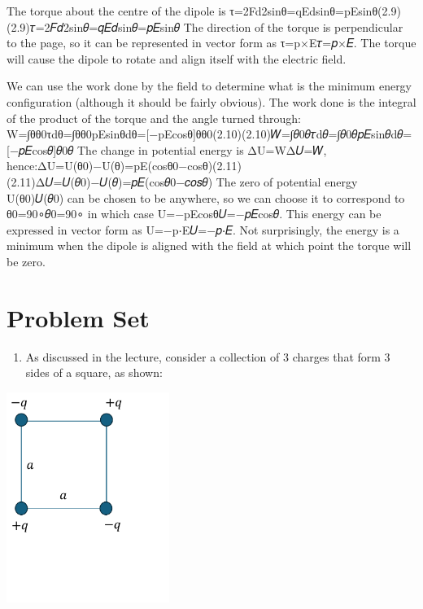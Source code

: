 \documentclass[
  letterpaper,
  DIV=11,
  numbers=noendperiod]{scrreprt}
\providecommand{\tightlist}{%
  \setlength{\itemsep}{0pt}\setlength{\parskip}{0pt}}\usepackage{longtable,booktabs,array}
\begin{document}
The torque about the centre of the dipole is
τ=2Fd2sinθ=qEdsinθ=\textbar p\textbar Esinθ(2.9)(2.9)𝜏=2𝐹𝑑2sin⁡𝜃=𝑞𝐸𝑑sin⁡𝜃=\textbar 𝑝\textbar 𝐸sin⁡𝜃
The direction of the torque is perpendicular to the page, so it can be
represented in vector form as τ=p×E𝜏=𝑝×𝐸. The torque will cause the
dipole to rotate and align itself with the electric field.

We can use the work done by the field to determine what is the minimum
energy configuration (although it should be fairly obvious). The work
done is the integral of the product of the torque and the angle turned
through:
W=∫θθ0\textbar τ\textbar dθ=∫θθ0pEsinθdθ={[}−pEcosθ{]}θθ0(2.10)(2.10)𝑊=∫𝜃0𝜃\textbar 𝜏\textbar d𝜃=∫𝜃0𝜃𝑝𝐸sin⁡𝜃d𝜃={[}−𝑝𝐸cos⁡𝜃{]}𝜃0𝜃
The change in potential energy is ΔU=WΔ𝑈=𝑊,
hence:ΔU=U(θ0)−U(θ)=pE(cosθ0−cosθ)(2.11)(2.11)Δ𝑈=𝑈(𝜃0)−𝑈(𝜃)=𝑝𝐸(cos⁡⁡𝜃0−𝑐𝑜𝑠𝜃)
The zero of potential energy U(θ0)𝑈(𝜃0) can be chosen to be anywhere, so
we can choose it to correspond to θ0=90∘𝜃0=90∘ in which case
U=−pEcosθ𝑈=−𝑝𝐸cos⁡𝜃. This energy can be expressed in vector form as
U=−p⋅E𝑈=−𝑝⋅𝐸. Not surprisingly, the energy is a minimum when the dipole
is aligned with the field at which point the torque will be zero.

\section{Problem Set}\label{problem-set-2}

\begin{enumerate}
\def\labelenumi{\arabic{enumi})}
\tightlist
\item
  As discussed in the lecture, consider a collection of 3 charges that
  form 3 sides of a square, as shown:
\end{enumerate}

\includegraphics[width=2.08333in,height=\textheight]{Figures/L3_3charges.png}
\end{document}
